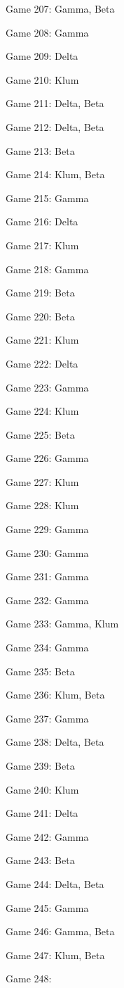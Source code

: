 \documentclass{article}
\begin{document}
\begin{multicols}{3}
\begin{compactitem}
\item Game 207:
Gamma, Beta
\item Game 208:
Gamma
\item Game 209:
Delta
\item Game 210:
Klum
\item Game 211:
Delta, Beta
\item Game 212:
Delta, Beta
\item Game 213:
Beta
\item Game 214:
Klum, Beta
\item Game 215:
Gamma
\item Game 216:
Delta
\item Game 217:
Klum
\item Game 218:
Gamma
\item Game 219:
Beta
\item Game 220:
Beta
\item Game 221:
Klum
\item Game 222:
Delta
\item Game 223:
Gamma
\item Game 224:
Klum
\item Game 225:
Beta
\item Game 226:
Gamma
\item Game 227:
Klum
\item Game 228:
Klum
\item Game 229:
Gamma
\item Game 230:
Gamma
\item Game 231:
Gamma
\item Game 232:
Gamma
\item Game 233:
Gamma, Klum
\item Game 234:
Gamma
\item Game 235:
Beta
\item Game 236:
Klum, Beta
\item Game 237:
Gamma
\item Game 238:
Delta, Beta
\item Game 239:
Beta
\item Game 240:
Klum
\item Game 241:
Delta
\item Game 242:
Gamma
\item Game 243:
Beta
\item Game 244:
Delta, Beta
\item Game 245:
Gamma
\item Game 246:
Gamma, Beta
\item Game 247:
Klum, Beta
\item Game 248:

\end{compactitem}
\end{multicols}
\end{document}
